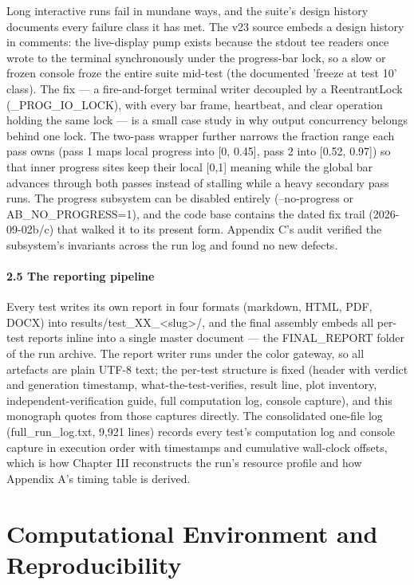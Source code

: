 \documentclass[10pt]{article}
\begin{document}
Long interactive runs fail in mundane ways, and the suite's design history documents every failure class it has met. The v23 source embeds a design history in comments: the live-display pump exists because the stdout tee readers once wrote to the terminal synchronously under the progress-bar lock, so a slow or frozen console froze the entire suite mid-test (the documented 'freeze at test 10' class). The fix --- a fire-and-forget terminal writer decoupled by a ReentrantLock (\_PROG\_IO\_LOCK), with every bar frame, heartbeat, and clear operation holding the same lock --- is a small case study in why output concurrency belongs behind one lock. The two-pass wrapper further narrows the fraction range each pass owns (pass 1 maps local progress into [0, 0.45], pass 2 into [0.52, 0.97]) so that inner progress sites keep their local [0,1] meaning while the global bar advances through both passes instead of stalling while a heavy secondary pass runs. The progress subsystem can be disabled entirely (--no-progress or AB\_NO\_PROGRESS=1), and the code base contains the dated fix trail (2026-09-02b/c) that walked it to its present form. Appendix C's audit verified the subsystem's invariants across the run log and found no new defects.

\paragraph{2.5 The reporting pipeline}

Every test writes its own report in four formats (markdown, HTML, PDF, DOCX) into results/test\_XX\_<slug>/, and the final assembly embeds all per-test reports inline into a single master document --- the FINAL\_REPORT folder of the run archive. The report writer runs under the color gateway, so all artefacts are plain UTF-8 text; the per-test structure is fixed (header with verdict and generation timestamp, what-the-test-verifies, result line, plot inventory, independent-verification guide, full computation log, console capture), and this monograph quotes from those captures directly. The consolidated one-file log (full\_run\_log.txt, 9,921 lines) records every test's computation log and console capture in execution order with timestamps and cumulative wall-clock offsets, which is how Chapter III reconstructs the run's resource profile and how Appendix A's timing table is derived.

\section{Computational Environment and Reproducibility}
\end{document}
